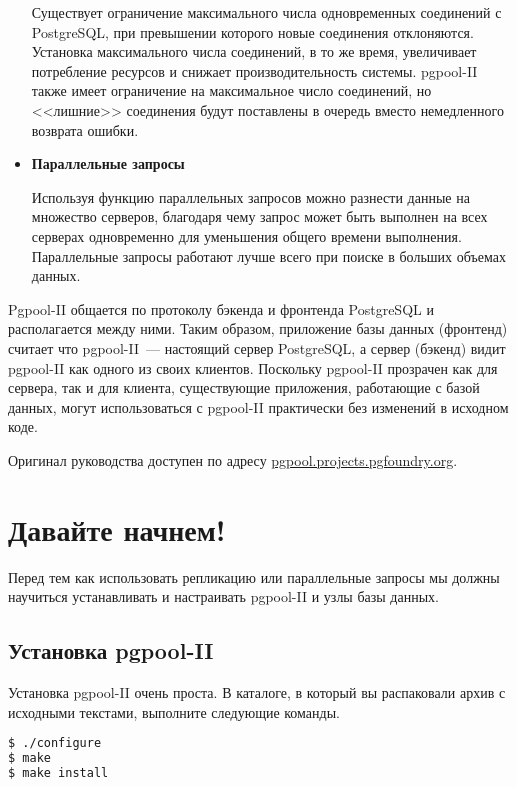 \begin{itemize}
Существует ограничение максимального числа одновременных соединений с PostgreSQL, при превышении которого новые соединения отклоняются. Установка максимального числа соединений, в то же время, увеличивает потребление ресурсов и снижает производительность системы. pgpool-II также имеет ограничение на максимальное число соединений, но <<лишние>> соединения будут поставлены в очередь вместо немедленного возврата ошибки.

\item \textbf{Параллельные запросы}

Используя функцию параллельных запросов можно разнести данные на множество серверов, благодаря чему запрос может быть выполнен на всех серверах одновременно для уменьшения общего времени выполнения. Параллельные запросы работают лучше всего при поиске в больших объемах данных.

\end{itemize}

Pgpool-II общается по протоколу бэкенда и фронтенда PostgreSQL и располагается между ними. Таким образом, приложение базы данных (фронтенд) считает что pgpool-II~--- настоящий сервер PostgreSQL, а сервер (бэкенд) видит pgpool-II как одного из своих клиентов. Поскольку pgpool-II прозрачен как для сервера, так и для клиента, существующие приложения, работающие с базой данных, могут использоваться с pgpool-II практически без изменений в исходном коде.

Оригинал руководства доступен по адресу \href{http://pgpool.projects.pgfoundry.org/pgpool-II/doc/tutorial-en.html}{pgpool.projects.pgfoundry.org}.

\section{Давайте начнем!}
\label{sec:pgpool-II-begin}

Перед тем как использовать репликацию или параллельные запросы мы должны научиться устанавливать и настраивать pgpool-II и узлы базы данных.

\subsection{Установка pgpool-II}

Установка pgpool-II очень проста. В каталоге, в который вы распаковали архив с исходными текстами, выполните следующие команды.

\begin{lstlisting}[language=Bash,label=lst:pgpool1,caption=Установка pgpool-II]
$ ./configure
$ make
$ make install
\end{lstlisting}

